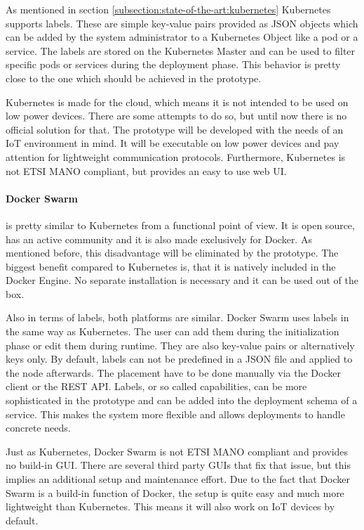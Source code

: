 As mentioned in section \ref{subsection:state-of-the-art:kubernetes} Kubernetes supports labels.
These are simple key-value pairs provided as \ac{JSON} objects which can be added by the system administrator to a Kubernetes Object like a pod or a service.
The labels are stored on the Kubernetes Master and can be used to filter specific pods or services during the deployment phase.
This behavior is pretty close to the one which should be achieved in the prototype.

Kubernetes is made for the cloud, which means it is not intended to be used on low power devices.
There are some attempts\autocite{kubernetes-installer-rpi}\autocite{kubernetes-on-arm}\autocite{hypriot:kubernetes-on-rpi} to do so, but until now there is no official solution for that.
The prototype will be developed with the needs of an \ac{IoT} environment in mind.
It will be executable on low power devices and pay attention for lightweight communication protocols.
Furthermore, Kubernetes is not \ac{ETSI} \ac{MANO} compliant, but provides an easy to use web \ac{UI}.

\paragraph{Docker Swarm} is pretty similar to Kubernetes from a functional point of view.
It is open source, has an active community and it is also made exclusively for Docker.
As mentioned before, this disadvantage will be eliminated by the prototype.
The biggest benefit compared to Kubernetes is, that it is natively included in the Docker Engine.
No separate installation is necessary and it can be used out of the box.

Also in terms of labels, both platforms are similar.
Docker Swarm uses labels in the same way as Kubernetes.
The user can add them during the initialization phase or edit them during runtime.
They are also key-value pairs or alternatively keys only.
By default, labels can not be predefined in a \ac{JSON} file and applied to the node afterwards.
The placement have to be done manually via the Docker client or the \ac{REST} \ac{API}.
Labels, or so called capabilities, can be more sophisticated in the prototype and can be added into the deployment schema of a service.
This makes the system more flexible and allows deployments to handle concrete needs.

Just as Kubernetes, Docker Swarm is not \ac{ETSI} \ac{MANO} compliant and provides no build-in \ac{GUI}.
There are several third party \acp{GUI} that fix that issue, but this implies an additional setup and maintenance effort.
Due to the fact that Docker Swarm is a build-in function of Docker, the setup is quite easy and much more lightweight than Kubernetes.
This means it will also work on \ac{IoT} devices by default.

